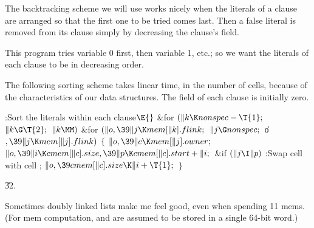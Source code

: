 The backtracking scheme we will use works nicely when the
literals
of a clause are arranged so that the first one to be tried comes last.
Then a false literal is removed from its clause simply by decreasing
the clause's  field.

This program tries variable 0 first, then variable 1, etc.; so we want the
literals of each clause to be in decreasing order.

The following sorting scheme takes linear time, in the number of cells,
because of the characteristics of our data structures. The  field
of each clause is initially zero.

\Y\B\4:Sort the literals within each clause\X${}\E{}$\6
\&{for} ${}(\|k\K\\{nonspec}-\T{1};{}$ ${}\|k\G\T{2};{}$ ${}\|k\MM){}$\1\6
\&{for} ${}(\|o,\39\|j\K\\{mem}[\|k].\\{flink};{}$ ${}\|j\G\\{nonspec};{}$ %
\|o${},\39\|j\K\\{mem}[\|j].\\{flink}){}$\5
${}\{{}$\1\6
${}\|o,\39\|c\K\\{mem}[\|j].\\{owner};{}$\6
${}\|o,\39\|i\K\\{cmem}[\|c].\\{size},\39\|p\K\\{cmem}[\|c].\\{start}+\|i;{}$\6
\&{if} ${}(\|j\I\|p){}$\1\5
:Swap cell  with cell \X;\2\6
${}\|o,\39\\{cmem}[\|c].\\{size}\K\|i+\T{1};{}$\6
\4${}\}{}$\2\2\par
\U32.\fi

Sometimes doubly linked lists make me feel good, even when
spending 11 mems.
(For mem computation,  and  are assumed to be
stored in
a single 64-bit word.)

